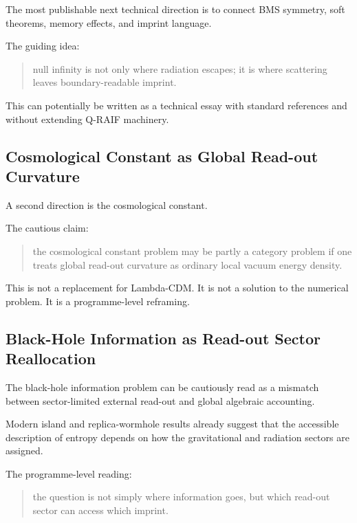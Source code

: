 \documentclass[12pt,a4paper]{article}
\theoremstyle{definition}
\theoremstyle{remark}
\begin{document}
The most publishable next technical direction is to connect BMS
symmetry, soft theorems, memory effects, and imprint language.

The guiding idea:

\begin{quote}
null infinity is not only where radiation escapes; it is where
scattering leaves boundary-readable imprint.
\end{quote}

This can potentially be written as a technical essay with standard
references and without extending Q-RAIF machinery.

\subsection{Cosmological Constant as Global Read-out
Curvature}\label{cosmological-constant-as-global-read-out-curvature}

A second direction is the cosmological constant.

The cautious claim:

\begin{quote}
the cosmological constant problem may be partly a category problem if
one treats global read-out curvature as ordinary local vacuum energy
density.
\end{quote}

This is not a replacement for Lambda-CDM. It is not a solution to the
numerical problem. It is a programme-level reframing.

\subsection{Black-Hole Information as Read-out Sector
Reallocation}\label{black-hole-information-as-read-out-sector-reallocation}

The black-hole information problem can be cautiously read as a mismatch
between sector-limited external read-out and global algebraic
accounting.

Modern island and replica-wormhole results already suggest that the
accessible description of entropy depends on how the gravitational and
radiation sectors are assigned.

The programme-level reading:

\begin{quote}
the question is not simply where information goes, but which read-out
sector can access which imprint.
\end{quote}
\end{document}
